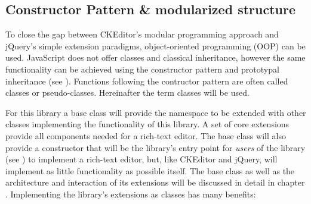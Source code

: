 

\subsection{Constructor Pattern \& modularized structure}
\label{subsec:const_pat_and_modules}

To close the gap between CKEditor's modular programming approach and jQuery's simple extension paradigms, object-oriented programming (OOP) can be used. JavaScript does not offer classes and classical inheritance, however the same functionality can be achieved using the constructor pattern and prototypal inheritance (see ). Functions following the contructor pattern are often called classes or pseudo-classes. Hereinafter the term classes will be used.

%
%
%





For this library a base class will provide the namespace to be extended with other classes implementing the functionality of this library. A set of core extensions provide all components needed for a rich-text editor. The base class will also provide a constructor that will be the library's entry point for \textit{users} of the library (see ) to implement a rich-text editor, but, like CKEditor and jQuery, will implement as little functionality as possible itself. The base class as well as the architecture and interaction of its extensions will be discussed in detail in chapter . Implementing the library's extensions as classes has many benefits:


